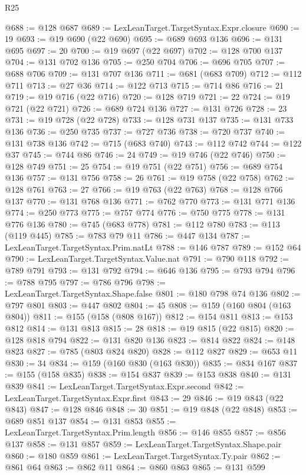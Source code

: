 \begin{lexlean}{R25}
\begin{coremodule}
@688 := @128 @687
@689 := LexLeanTarget.TargetSyntax.Expr.closure
@690 := 19
@693 := @19 @690 (@22 @690)
@695 := @689 @693 @136
@696 := @131 @695
@697 := 20
@700 := @19 @697 (@22 @697)
@702 := @128 @700 @137
@704 := @131 @702 @136
@705 := @250 @704
@706 := @696 @705
@707 := @688 @706
@709 := @131 @707 @136
@711 := @681 (@683 @709)
@712 := @112 @711
@713 := @27 @36
@714 := @122 @713
@715 := @714 @86
@716 := 21
@719 := @19 @716 (@22 @716)
@720 := @128 @719
@721 := 22
@724 := @19 @721 (@22 @721)
@726 := @689 @724 @136
@727 := @131 @726
@728 := 23
@731 := @19 @728 (@22 @728)
@733 := @128 @731 @137
@735 := @131 @733 @136
@736 := @250 @735
@737 := @727 @736
@738 := @720 @737
@740 := @131 @738 @136
@742 := @715 (@683 @740)
@743 := @112 @742
@744 := @122 @37
@745 := @744 @86
@746 := 24
@749 := @19 @746 (@22 @746)
@750 := @128 @749
@751 := 25
@754 := @19 @751 (@22 @751)
@756 := @689 @754 @136
@757 := @131 @756
@758 := 26
@761 := @19 @758 (@22 @758)
@762 := @128 @761
@763 := 27
@766 := @19 @763 (@22 @763)
@768 := @128 @766 @137
@770 := @131 @768 @136
@771 := @762 @770
@773 := @131 @771 @136
@774 := @250 @773
@775 := @757 @774
@776 := @750 @775
@778 := @131 @776 @136
@780 := @745 (@683 @778)
@781 := @112 @780
@783 := @113 (@119 @445)
@785 := @783 @79 @11
@786 := @447 @134
@787 := LexLeanTarget.TargetSyntax.Prim.natLt
@788 := @146 @787
@789 := @152 @64
@790 := LexLeanTarget.TargetSyntax.Value.nat
@791 := @790 @118
@792 := @789 @791
@793 := @131 @792
@794 := @646 @136
@795 := @793 @794
@796 := @788 @795
@797 := @786 @796
@798 := LexLeanTarget.TargetSyntax.Shape.false
@801 := @180 @798 @74 @136
@802 := @797 @801
@803 := @447 @802
@804 := 45
@808 := @159 (@160 @804 (@163 @804))
@811 := @155 (@158 (@808 @167))
@812 := @154 @811
@813 := @153 @812
@814 := @131 @813
@815 := 28
@818 := @19 @815 (@22 @815)
@820 := @128 @818 @794
@822 := @131 @820 @136
@823 := @814 @822
@824 := @148 @823
@827 := @785 (@803 @824 @820)
@828 := @112 @827
@829 := @653 @11
@830 := 34
@834 := @159 (@160 @830 (@163 @830))
@835 := @834 @167
@837 := @155 (@158 @835)
@838 := @154 @837
@839 := @153 @838
@840 := @131 @839
@841 := LexLeanTarget.TargetSyntax.Expr.second
@842 := LexLeanTarget.TargetSyntax.Expr.first
@843 := 29
@846 := @19 @843 (@22 @843)
@847 := @128 @846
@848 := 30
@851 := @19 @848 (@22 @848)
@853 := @689 @851 @137
@854 := @131 @853
@855 := LexLeanTarget.TargetSyntax.Prim.length
@856 := @146 @855
@857 := @856 @137
@858 := @131 @857
@859 := LexLeanTarget.TargetSyntax.Shape.pair
@860 := @180 @859
@861 := LexLeanTarget.TargetSyntax.Ty.pair
@862 := @861 @64
@863 := @862 @11
@864 := @860 @863
@865 := @131 @599

\end{coremodule}
\end{lexlean}
